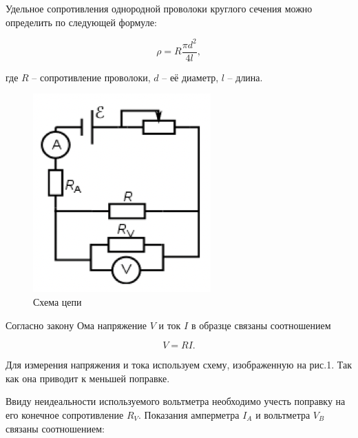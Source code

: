 \documentclass[a4paper,12pt]{article} %
\begin{document}
Удельное сопротивления однородной проволоки круглого сечения можно определить по следующей формуле:


\[\rho = R \frac{\pi d^2}{4l},\]


\noindent где $R$ -- сопротивление проволоки, $d$ -- её диаметр, $l$ -- длина.

\medskip

\begin{figure} 
\vspace{-5ex}
\includegraphics[width=\linewidth]{scheme1}
\caption{Схема цепи}
\label{fig:somelabel}
\end{figure}

Согласно закону Ома напряжение $V$ и ток $I$ в образце связаны соотношением


\[V = RI.\]

Для измерения напряжения и тока используем схему, изображенную на рис.1. Так как она приводит к меньшей поправке.
\medskip

Ввиду неидеальности используемого вольтметра необходимо учесть поправку на его конечное сопротивление $R_V$. Показания амперметра $I_A$ и вольтметра $V_B$ связаны соотношением:
\end{document}
